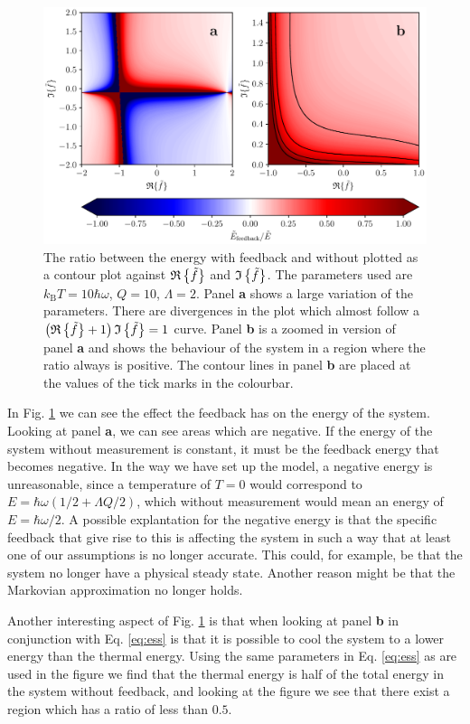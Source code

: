 \begin{figure}[t]
    \centering
    \includegraphics[width=\textwidth]{figures/energyFeedbackRatio.pdf}
    \caption{\small The ratio between the energy with feedback and without plotted as a contour plot against $\mathfrak{R}\left\{\tilde{f}\right\}$ and $\mathfrak{I}\left\{\tilde{f}\right\}$. The parameters used are $k_\text{B}T = 10 \hbar\omega$, $Q = 10$, $\Lambda = 2$. Panel \textbf{a} shows a large variation of the parameters. There are divergences in the plot which almost follow a $\left(\mathfrak{R}\left\{\tilde{f}\right\} + 1 \right)\mathfrak{I}\left\{\tilde{f}\right\} = 1$ curve. Panel \textbf{b} is a zoomed in version of panel \textbf{a} and shows the behaviour of the system in a region where the ratio always is positive. The contour lines in panel \textbf{b} are placed at the values of the tick marks in the colourbar.}
    \label{fig:energyFeedbackRatio}
\end{figure}
In Fig. \ref{fig:energyFeedbackRatio} we can see the effect the feedback has on the energy of the system. Looking at panel \textbf{a}, we can see areas which are negative. If the energy of the system without measurement is constant, it must be the feedback energy that becomes negative. In the way we have set up the model, a negative energy is unreasonable, since a temperature of $T=0$ would correspond to $E =\hbar\omega( 1/2 + \Lambda Q/2)$, which without measurement would mean an energy of $E = \hbar\omega/2$. A possible explantation for the negative energy is that the specific feedback that give rise to this is affecting the system in such a way that at least one of our assumptions is no longer accurate. This could, for example, be that the system no longer have a physical steady state. Another reason might be that the Markovian approximation no longer holds.

Another interesting aspect of Fig. \ref{fig:energyFeedbackRatio} is that when looking at panel \textbf{b} in conjunction with Eq. \eqref{eq:ess} is that it is possible to cool the system to a lower energy than the thermal energy. Using the same parameters in Eq. \eqref{eq:ess} as are used in the figure we find that the thermal energy is half of the total energy in the system without feedback, and looking at the figure we see that there exist a region which has a ratio of less than $0.5$.

